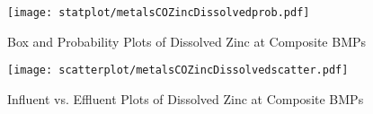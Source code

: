         \begin{figure}[hb]   %
            \centering
            \texttt{[image: statplot/metalsCOZincDissolvedprob.pdf]}
            \caption{Box and Probability Plots of Dissolved Zinc at Composite BMPs}
        \end{figure}         %
        
        
        \begin{figure}[hb]   %
            \centering
            \texttt{[image: scatterplot/metalsCOZincDissolvedscatter.pdf]}
            \caption{Influent vs. Effluent Plots of Dissolved Zinc at Composite BMPs}
        \end{figure}         %
        \clearpage
        